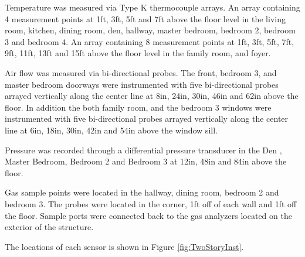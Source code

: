 \documentclass{article}
\begin{document}
Temperature was measured via Type K thermocouple arrays. An array containing 4 measurement points at 1ft, 3ft, 5ft and 7ft above the floor level in the living room, kitchen, dining room, den, hallway, master bedroom, bedroom 2, bedroom 3 and bedroom 4. An array containing 8 measurement points at 1ft, 3ft, 5ft, 7ft, 9ft, 11ft, 13ft and 15ft above the floor level in the family room, and foyer.

Air flow was measured via bi-directional probes. The front, bedroom 3, and master bedroom doorways were instrumented with five bi-directional probes arrayed vertically along the center line at 8in, 24in, 30in, 46in and 62in above the floor. In addition the both family room, and the bedroom 3 windows were instrumented with five bi-directional probes arrayed vertically along the center line at 6in, 18in, 30in, 42in and 54in above the window sill. 

Pressure was recorded through a differential pressure transducer in the Den , Master Bedroom, Bedroom 2 and Bedroom 3 at 12in, 48in and 84in above the floor. 

Gas sample points were located in the hallway, dining room, bedroom 2 and bedroom 3. The probes were located in the corner, 1ft off of each wall and 1ft off the floor. Sample ports were connected back to the gas analyzers located on the exterior of the structure. 

The locations of each sensor is shown in Figure \ref{fig:TwoStoryInst}.
\end{document}

